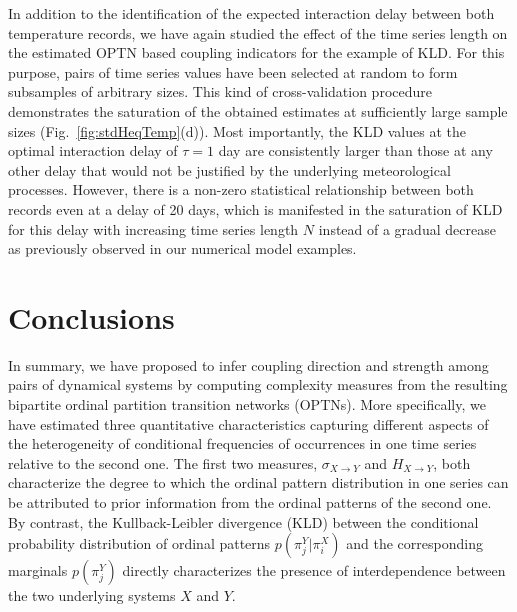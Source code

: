 \documentclass[12pt,aip,cha,reprint,nofootinbib]{revtex4-1}
\begin{document}
In addition to the identification of the expected interaction delay between both temperature records, we have again studied the effect of the time series length on the estimated OPTN based coupling indicators for the example of KLD. For this purpose, pairs of time series values have been selected at random to form subsamples of arbitrary sizes. This kind of cross-validation procedure demonstrates the saturation of the obtained estimates at sufficiently large sample sizes (Fig.~\ref{fig:stdHeqTemp}(d)). Most importantly, the KLD values at the optimal interaction delay of $\tau=1$ day are consistently larger than those at any other delay that would not be justified by the underlying meteorological processes. However, there is a non-zero statistical relationship between both records even at a delay of 20 days, which is manifested in the saturation of KLD for this delay with increasing time series length $N$ instead of a gradual decrease as previously observed in our numerical model examples.

\section{Conclusions} \label{sec:con}

In summary, we have proposed to infer coupling direction and strength among pairs of dynamical systems by computing complexity measures from the resulting bipartite ordinal {\color{red}partition} transition networks (OPTNs). More specifically, we have estimated three quantitative characteristics capturing different aspects of the heterogeneity of conditional frequencies of occurrences in one time series relative to the second one. The first two measures, $\sigma_{X\to Y}$ and $H_{X\to Y}$, both characterize the degree to which the ordinal pattern distribution in one series can be attributed to prior information from the ordinal patterns of the second one. By contrast, the Kullback-Leibler divergence (KLD) between the conditional probability distribution of ordinal patterns $p(\pi_{j}^{Y} | \pi_i^{X})$ and the corresponding marginals $p(\pi_j^{Y})$ directly characterizes the presence of interdependence between the two underlying systems $X$ and $Y$. 
\end{document}
